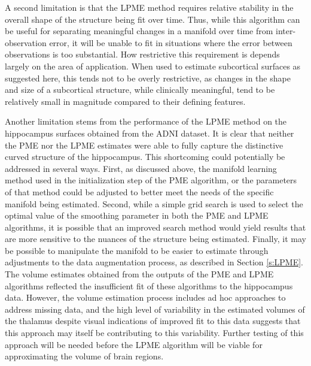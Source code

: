 \documentclass[11pt,reqno]{article}
\theoremstyle{definition}
\begin{document}
A second limitation is that the LPME method requires relative stability in the overall shape of the structure being fit over time. Thus, while this algorithm can be useful for separating meaningful changes in a manifold over time from inter-observation error, it will be unable to fit in situations where the error between observations is too substantial. How restrictive this requirement is depends largely on the area of application. When used to estimate subcortical surfaces as suggested here, this tends not to be overly restrictive, as changes in the shape and size of a subcortical structure, while clinically meaningful, tend to be relatively small in magnitude compared to their defining features.

Another limitation stems from the performance of the LPME method on the hippocampus surfaces obtained from the ADNI dataset. It is clear that neither the PME nor the LPME estimates were able to fully capture the distinctive curved structure of the hippocampus. This shortcoming could potentially be addressed in several ways. First, as discussed above, the manifold learning method used in the initialization step of the PME algorithm, or the parameters of that method could be adjusted to better meet the needs of the specific manifold being estimated. Second, while a simple grid search is used to select the optimal value of the smoothing parameter in both the PME and LPME algorithms, it is possible that an improved search method would yield results that are more sensitive to the nuances of the structure being estimated. Finally, it may be possible to manipulate the manifold to be easier to estimate through adjustments to the data augmentation process, as described in Section \ref{s:LPME}. The volume estimates obtained from the outputs of the PME and LPME algorithms reflected the insufficient fit of these algorithms to the hippocampus data. However, the volume estimation process includes ad hoc approaches to address missing data, and the high level of variability in the estimated volumes of the thalamus despite visual indications of improved fit to this data suggests that this approach may itself be contributing to this variability. Further testing of this approach will be needed before the LPME algorithm will be viable for approximating the volume of brain regions.
\end{document}
